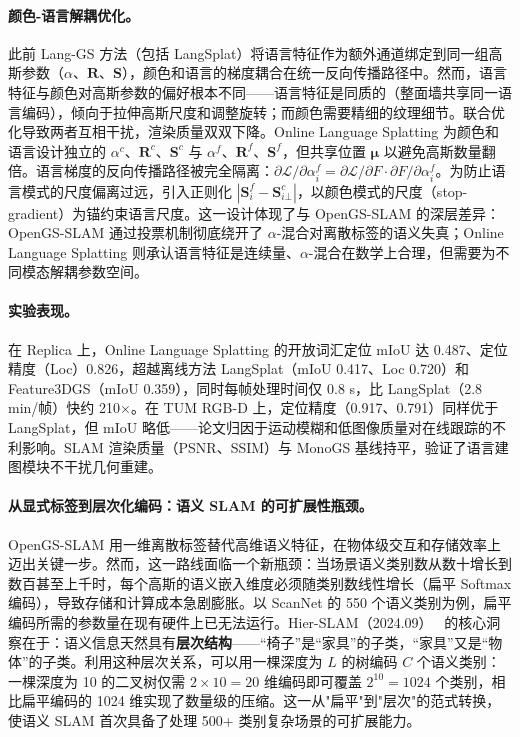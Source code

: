 \paragraph{颜色-语言解耦优化。}
此前 Lang-GS 方法（包括 LangSplat）将语言特征作为额外通道绑定到同一组高斯参数（$\alpha$、$\mathbf{R}$、$\mathbf{S}$），颜色和语言的梯度耦合在统一反向传播路径中。然而，语言特征与颜色对高斯参数的偏好根本不同——语言特征是同质的（整面墙共享同一语言编码），倾向于拉伸高斯尺度和调整旋转；而颜色需要精细的纹理细节。联合优化导致两者互相干扰，渲染质量双双下降。Online Language Splatting 为颜色和语言设计独立的 $\alpha^c$、$\mathbf{R}^c$、$\mathbf{S}^c$ 与 $\alpha^f$、$\mathbf{R}^f$、$\mathbf{S}^f$，但共享位置 $\bm{\mu}$ 以避免高斯数量翻倍。语言梯度的反向传播路径被完全隔离：$\partial\mathcal{L}/\partial\alpha_i^f = \partial\mathcal{L}/\partial F \cdot \partial F/\partial\alpha_i^f$。为防止语言模式的尺度偏离过远，引入正则化 $|\mathbf{S}_i^f - \mathbf{S}_{i\bot}^c|$，以颜色模式的尺度（stop-gradient）为锚约束语言尺度。这一设计体现了与 OpenGS-SLAM 的深层差异：OpenGS-SLAM 通过投票机制彻底绕开了 $\alpha$-混合对离散标签的语义失真；Online Language Splatting 则承认语言特征是连续量、$\alpha$-混合在数学上合理，但需要为不同模态解耦参数空间。

\paragraph{实验表现。}
在 Replica 上，Online Language Splatting 的开放词汇定位 mIoU 达 0.487、定位精度（Loc）0.826，超越离线方法 LangSplat（mIoU 0.417、Loc 0.720）和 Feature3DGS（mIoU 0.359），同时每帧处理时间仅 0.8 s，比 LangSplat（2.8 min/帧）快约 210$\times$。在 TUM RGB-D 上，定位精度（0.917、0.791）同样优于 LangSplat，但 mIoU 略低——论文归因于运动模糊和低图像质量对在线跟踪的不利影响。SLAM 渲染质量（PSNR、SSIM）与 MonoGS 基线持平，验证了语言建图模块不干扰几何重建。

\paragraph{从显式标签到层次化编码：语义 SLAM 的可扩展性瓶颈。}
OpenGS-SLAM 用一维离散标签替代高维语义特征，在物体级交互和存储效率上迈出关键一步。然而，这一路线面临一个新瓶颈：当场景语义类别数从数十增长到数百甚至上千时，每个高斯的语义嵌入维度必须随类别数线性增长（扁平 Softmax 编码），导致存储和计算成本急剧膨胀。以 ScanNet 的 550 个语义类别为例，扁平编码所需的参数量在现有硬件上已无法运行。Hier-SLAM（2024.09）~\cite{2409_12518} 的核心洞察在于：语义信息天然具有\textbf{层次结构}——``椅子''是``家具''的子类，``家具''又是``物体''的子类。利用这种层次关系，可以用一棵深度为 $L$ 的树编码 $C$ 个语义类别：一棵深度为 10 的二叉树仅需 $2 \times 10 = 20$ 维编码即可覆盖 $2^{10} = 1024$ 个类别，相比扁平编码的 1024 维实现了数量级的压缩。这一从"扁平"到"层次"的范式转换，使语义 SLAM 首次具备了处理 500+ 类别复杂场景的可扩展能力。

